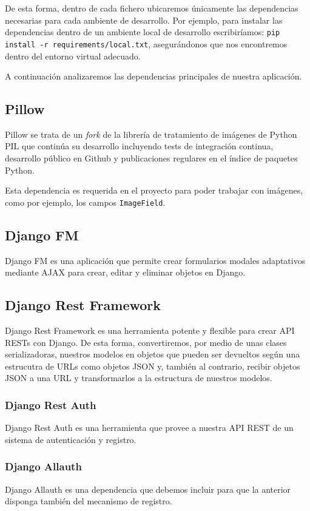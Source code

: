 De esta forma, dentro de cada fichero ubicaremos únicamente las dependencias necesarias para cada ambiente de desarrollo. Por ejemplo, para instalar las dependencias dentro de un ambiente local de desarrollo escribiríamos: \texttt{pip install -r requirements/local.txt}, asegurándonos que nos encontremos dentro del entorno virtual adecuado.

A continuación analizaremos las dependencias principales de nuestra aplicación.

\subsection{Pillow}

Pillow \cite{Pillow} se trata de un \textit{fork} de la librería de tratamiento de imágenes de Python PIL que continúa su desarrollo incluyendo tests de integración continua, desarrollo público en Github y publicaciones regulares en el índice de paquetes Python. 

Esta dependencia es requerida en el proyecto para poder trabajar con imágenes, como por ejemplo, los campos \texttt{ImageField}.

\subsection{Django FM}

Django FM \cite{DjFM} es una aplicación que permite crear formularios modales adaptativos mediante AJAX para crear, editar y eliminar objetos en Django.

\subsection{Django Rest Framework}
Django Rest Framework \cite{DjRF} es una herramienta potente y flexible para crear API RESTs con Django. De esta forma, convertiremos, por medio de unas clases serializadoras, nuestros modelos en objetos que pueden ser devueltos según una estrucutra de URLs como objetos JSON y, también al contrario, recibir objetos JSON a una URL y transformarlos a la estructura de nuestros modelos.

\subsubsection{Django Rest Auth}
Django Rest Auth \cite{DjRA} es una herramienta que provee a nuestra API REST de un sistema de autenticación y registro.

\subsubsection{Django Allauth}
Django Allauth \cite{DjAllauth} es una dependencia que debemos incluir para que la anterior disponga también del mecanismo de registro. 

